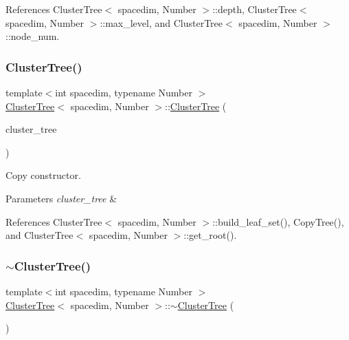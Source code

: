 References Cluster\+Tree$<$ spacedim, Number $>$\+::depth, Cluster\+Tree$<$ spacedim, Number $>$\+::max\+\_\+level, and Cluster\+Tree$<$ spacedim, Number $>$\+::node\+\_\+num.

\mbox{\label{classClusterTree_a40d41a3a87bee15fe2d0b39a42f705d2}} 
\subsubsection{\texorpdfstring{Cluster\+Tree()}{ClusterTree()}\hspace{0.1cm}{\footnotesize\ttfamily [5/5]}}
{\footnotesize\ttfamily template$<$int spacedim, typename Number $>$ \\
\hyperlink{classClusterTree}{Cluster\+Tree}$<$ spacedim, Number $>$\+::\hyperlink{classClusterTree}{Cluster\+Tree} (\begin{DoxyParamCaption}\item[{const \hyperlink{classClusterTree}{Cluster\+Tree}$<$ spacedim, Number $>$ \&}]{cluster\+\_\+tree }\end{DoxyParamCaption})}

Copy constructor. 
\begin{DoxyParams}{Parameters}
{\em cluster\+\_\+tree} & \\
\hline
\end{DoxyParams}


References Cluster\+Tree$<$ spacedim, Number $>$\+::build\+\_\+leaf\+\_\+set(), Copy\+Tree(), and Cluster\+Tree$<$ spacedim, Number $>$\+::get\+\_\+root().

\mbox{\label{classClusterTree_ad1b0ac0f6474de90d4fb528b6ed28db6}} 
\subsubsection{\texorpdfstring{$\sim$\+Cluster\+Tree()}{~ClusterTree()}}
{\footnotesize\ttfamily template$<$int spacedim, typename Number $>$ \\
\hyperlink{classClusterTree}{Cluster\+Tree}$<$ spacedim, Number $>$\+::$\sim$\hyperlink{classClusterTree}{Cluster\+Tree} (\begin{DoxyParamCaption}{ }\end{DoxyParamCaption})}

